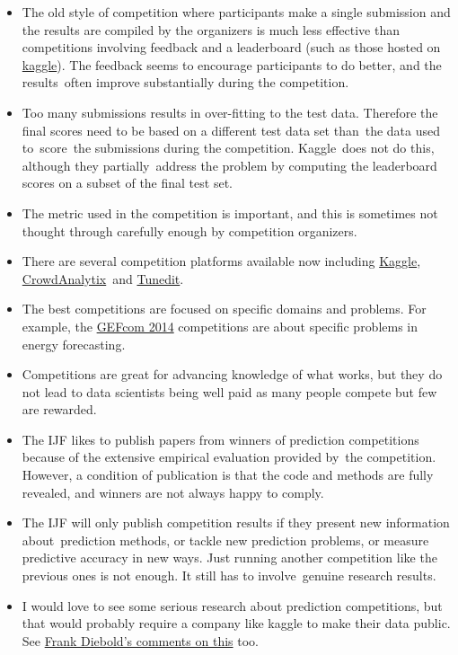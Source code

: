 \documentclass[11pt,a4paper,]{article}
\begin{document}
\begin{itemize}
\item
  The old style of competition where participants make a single submission and the results are compiled by the organizers is much less effective than competitions involving feedback and a leaderboard (such as those hosted on \href{http://www.kaggle.com}{kaggle}). The feedback seems to encourage participants to do better, and the results~often improve substantially during the competition.
\item
  Too many submissions results in over-fitting to the test data. Therefore the final scores need to be based on a different test data set than~the data used to~score~the submissions during the competition. Kaggle~does not do this, although they partially~address the problem by computing the leaderboard scores on a subset of the final test set.
\item
  The metric used in the competition is important, and this is sometimes not thought through carefully enough by competition organizers.
\item
  There are several competition platforms available now including \href{http://kaggle.com}{Kaggle}, \href{http://crowdanalytix.com}{CrowdAnalytix}~and \href{http://tunedit.org/}{Tunedit}.
\item
  The best competitions are focused on specific domains and problems. For example, the \href{http://www.gefcom.org}{GEFcom 2014} competitions are about specific problems in energy forecasting.
\item
  Competitions are great for advancing knowledge of what works, but they do not lead to data scientists being well paid as many people compete but few are rewarded.
\item
  The IJF likes to publish papers from winners of prediction competitions because of the extensive empirical evaluation provided by~the competition. However, a condition of publication is that the code and methods are fully revealed, and winners are not always happy to comply.
\item
  The IJF will only publish competition results if they present new information about~prediction methods, or tackle new prediction problems, or measure predictive accuracy in new ways. Just running another competition like the previous ones is not enough. It still has to involve~genuine research results.
\item
  I would love to see some serious research about prediction competitions, but that would probably require a company like kaggle to make their data public. See \href{http://fxdiebold.blogspot.com.au/2014/04/on-kaggle-forecasting-competitions-part_28.html}{Frank Diebold's comments on this} too.

\end{itemize}
\end{document}
